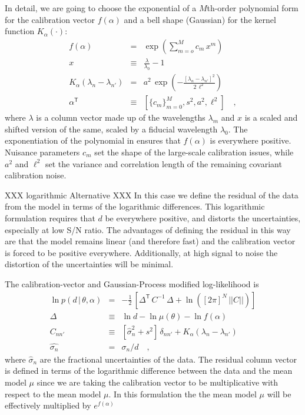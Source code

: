 \documentclass[iop,numberedappendix]{emulateapj}
\newcommand{\transpose}[1]{{#1}^{\!\mathsf T}}
\newcommand{\given}{\,|\,}
\renewcommand{\det}[1]{||{#1}||}
\begin{document}
In detail, we are going to choose the exponential of a $M$th-order
polynomial form for the calibration vector $f(\alpha)$ and a bell
shape (Gaussian) for the kernel function $K_\alpha(\cdot)$:
\begin{eqnarray}\displaystyle
f(\alpha) &=& \exp\left(\sum_{m=o}^M c_m\,x^m\right)
\\
x &\equiv& \frac{\lambda}{\lambda_0} - 1
\\
K_\alpha(\lambda_n - \lambda_{n'}) &=& a^2\,\exp\left(-\frac{[\lambda_n - \lambda_{n'}]^2}{2\,\ell^2}\right)
\\
\transpose{\alpha} &\equiv& \left[ \{c_m\}_{m=0}^M, s^2, a^2, \ell^2 \right]
\quad ,
\end{eqnarray}
where $\lambda$ is a column vector made up of the wavelengths
$\lambda_m$ and $x$ is a scaled and shifted version of the same,
scaled by a fiducial wavelength $\lambda_0$.  The exponentiation of
the polynomial in ensures that $f(\alpha)$ is everywhere positive.
Nuisance parameters $c_m$ set the shape of the large-scale calibration
issues, while $a^2$ and $\ell^2$ set the variance and correlation
length of the remaining covariant calibration noise.

XXX logarithmic Alternative XXX
In this case we define the residual of the data from the model in
terms of the logarithmic differences.  This logarithmic formulation
requires that $d$ be everywhere positive, and distorts the
uncertainties, especially at low S/N ratio.  The advantages of
defining the residual in this way are that the model remains linear
(and therefore fast) and the calibration vector is forced to be
positive everywhere.  Additionally, at high signal to noise the
distortion of the uncertainties will be minimal.

The calibration-vector and Gaussian-Process modified log-likelihood is
\begin{eqnarray}\label{eq:spectroscopicLF}
\ln p(d\given\theta,\alpha) &=&
                                -\frac{1}{2}\,\left[\transpose{\Delta}\,C^{-1}\,\Delta
                                + \ln([2\pi]^N\,\det{C}) \right]
\\
\Delta &\equiv& \ln d - \ln \mu(\theta) - \ln f(\alpha) 
\\
C_{nn'} &\equiv& [\hat{\sigma}_n^2 + s^2]\,\delta_{nn'} +
K_\alpha(\lambda_n - \lambda_{n'})
\\
\hat{\sigma_n} & = &\sigma_n/d
\quad ,
\end{eqnarray}
where $\hat{\sigma}_n$ are the fractional uncertainties of the data.
The residual column vector is defined in terms of the logarithmic
difference between the data and the mean model $\mu$ since we are
taking the calibration vector to be multiplicative with respect to the
mean model $\mu$. In this formulation the the mean model $\mu$ will be
effectively multiplied by $e ^{f(\alpha)}$
\end{document}

